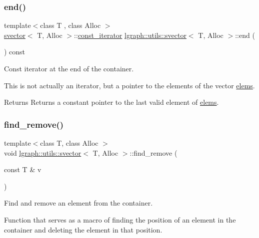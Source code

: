 \subsubsection{\texorpdfstring{end()}{end()}\hspace{0.1cm}{\footnotesize\ttfamily [2/2]}}
{\footnotesize\ttfamily template$<$class T , class Alloc $>$ \\
\hyperlink{classlgraph_1_1utils_1_1svector}{svector}$<$ T, Alloc $>$\+::\hyperlink{classlgraph_1_1utils_1_1svector_a50774ce617a742e76f3fb8cc0a7a9445}{const\+\_\+iterator} \hyperlink{classlgraph_1_1utils_1_1svector}{lgraph\+::utils\+::svector}$<$ T, Alloc $>$\+::end (\begin{DoxyParamCaption}{ }\end{DoxyParamCaption}) const}



Const iterator at the end of the container. 

This is not actually an iterator, but a pointer to the elements of the vector \hyperlink{classlgraph_1_1utils_1_1svector_aa72e9ffeb58f88d3cb01671e3e672a45}{elems}. \begin{DoxyReturn}{Returns}
Returns a constant pointer to the last valid element of \hyperlink{classlgraph_1_1utils_1_1svector_aa72e9ffeb58f88d3cb01671e3e672a45}{elems}. 
\end{DoxyReturn}
\mbox{\label{classlgraph_1_1utils_1_1svector_a2c67e3086677ea7f0c8526e3d12230aa}} 
\subsubsection{\texorpdfstring{find\+\_\+remove()}{find\_remove()}}
{\footnotesize\ttfamily template$<$class T, class Alloc $>$ \\
void \hyperlink{classlgraph_1_1utils_1_1svector}{lgraph\+::utils\+::svector}$<$ T, Alloc $>$\+::find\+\_\+remove (\begin{DoxyParamCaption}\item[{const T \&}]{v }\end{DoxyParamCaption})}



Find and remove an element from the container. 

Function that serves as a macro of finding the position of an element in the container and deleting the element in that position.


